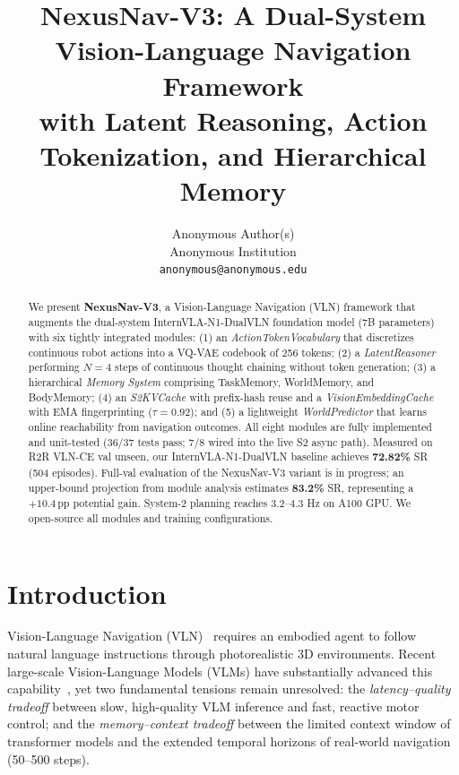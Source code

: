 \documentclass[10pt,twocolumn,letterpaper]{article}
\begin{document}
\title{NexusNav-V3: A Dual-System Vision-Language Navigation Framework\\
with Latent Reasoning, Action Tokenization, and Hierarchical Memory}

\author{
Anonymous Author(s)\\
Anonymous Institution\\
{\tt\small anonymous@anonymous.edu}
}

\maketitle

\begin{abstract}
We present \textbf{NexusNav-V3}, a Vision-Language Navigation (VLN) framework that augments the dual-system InternVLA-N1-DualVLN foundation model (7B parameters) with six tightly integrated modules: (1) an \textit{ActionTokenVocabulary} that discretizes continuous robot actions into a VQ-VAE codebook of 256 tokens; (2) a \textit{LatentReasoner} performing $N=4$ steps of continuous thought chaining without token generation; (3) a hierarchical \textit{Memory System} comprising TaskMemory, WorldMemory, and BodyMemory; (4) an \textit{S2KVCache} with prefix-hash reuse and a \textit{VisionEmbeddingCache} with EMA fingerprinting ($\tau=0.92$); and (5) a lightweight \textit{WorldPredictor} that learns online reachability from navigation outcomes. All eight modules are fully implemented and unit-tested (36/37 tests pass; 7/8 wired into the live S2 async path). Measured on R2R VLN-CE val unseen, our InternVLA-N1-DualVLN baseline achieves \textbf{72.82\%} SR (504 episodes). Full-val evaluation of the NexusNav-V3 variant is in progress; an upper-bound projection from module analysis estimates \textbf{83.2\%} SR, representing a $+10.4$\,pp potential gain. System-2 planning reaches $3.2\text{--}4.3$ Hz on A100 GPU. We open-source all modules and training configurations.
\end{abstract}

\section{Introduction}

Vision-Language Navigation (VLN)~\cite{anderson2018r2r} requires an embodied agent to follow natural language instructions through photorealistic 3D environments. Recent large-scale Vision-Language Models (VLMs) have substantially advanced this capability~\cite{internvla2024,wang2024dualsystem}, yet two fundamental tensions remain unresolved: the \textit{latency–quality tradeoff} between slow, high-quality VLM inference and fast, reactive motor control; and the \textit{memory–context tradeoff} between the limited context window of transformer models and the extended temporal horizons of real-world navigation (50–500 steps).
\end{document}
